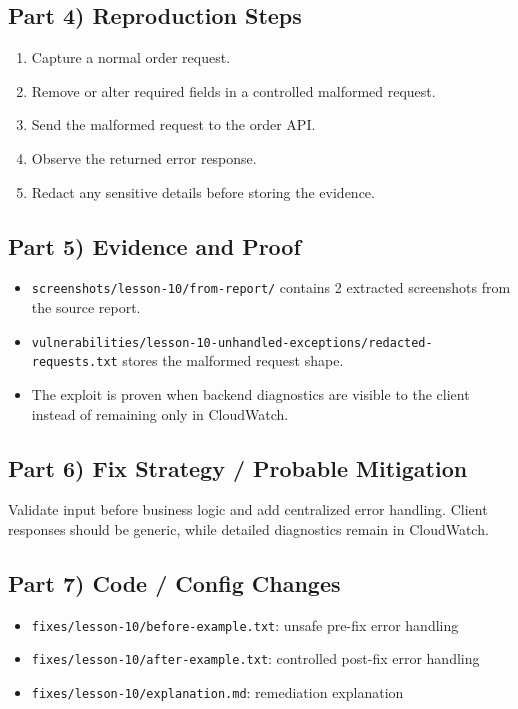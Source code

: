 \documentclass[12pt]{article}
\begin{document}
\subsection*{Part 4) Reproduction Steps}
\begin{enumerate}
\item Capture a normal order request.
\item Remove or alter required fields in a controlled malformed request.
\item Send the malformed request to the order API.
\item Observe the returned error response.
\item Redact any sensitive details before storing the evidence.
\end{enumerate}

\subsection*{Part 5) Evidence and Proof}
\begin{itemize}
\item \texttt{screenshots/lesson-10/from-report/} contains 2 extracted screenshots from the source report.
\item \texttt{vulnerabilities/lesson-10-unhandled-exceptions/redacted-requests.txt} stores the malformed request shape.
\item The exploit is proven when backend diagnostics are visible to the client instead of remaining only in CloudWatch.
\end{itemize}

\subsection*{Part 6) Fix Strategy / Probable Mitigation}
Validate input before business logic and add centralized error handling. Client responses should be generic, while detailed diagnostics remain in CloudWatch.

\subsection*{Part 7) Code / Config Changes}
\begin{itemize}
\item \texttt{fixes/lesson-10/before-example.txt}: unsafe pre-fix error handling
\item \texttt{fixes/lesson-10/after-example.txt}: controlled post-fix error handling
\item \texttt{fixes/lesson-10/explanation.md}: remediation explanation
\end{itemize}
\end{document}
